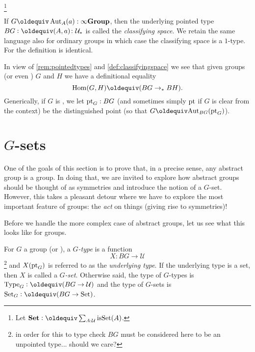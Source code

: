 \footnote{Let $\typeset\defequi \sum_{A:\mathcal U}\isset(A)$.}
\begin{definition}\label{def:classifyingspace}
  If $G\oldequiv\Aut_A(a):\typeinftygp$, then the underlying pointed type $BG\defequi (A,a)\colon\pttype$ is called the  \emph{classifying space}.  We retain the same language also for ordinary groups in which case the classifying space is a $1$-type.   For \inftygps the definition is identical.
\end{definition}
\begin{remark}
  In view of \cref{rem:pointedtypes} and \cref{def:classifyingspace} we see that given groups (or even \inftygps) $G$ and $H$ we have a definitional equality
$$\Hom(G,H)\oldequiv(BG\to_*BH).$$
Generically, if $G$ is \aninftygp, we let ${\mathord{\mathrm{pt}}}_G:BG$ (and sometimes simply ${\mathord{\mathrm{pt}}}$ if $G$ is clear from the context) be the distinguished point (so that $G\oldequiv\aut_{BG}(\pt_G)$).
\end{remark}





\section{$G$-sets}
\label{sec:gsets}

One of the goals of this section is to prove that, in a precise sense, any abstract group is a group.  In doing that, we are invited to explore how abstract groups should be thought of as symmetries and introduce the notion of a $G$-set.  However, this takes a pleasant detour where we have to explore the most important feature of groups: the \emph{act} on things (giving rise to symmetries)!

Before we handle the more complex case of abstract groups, let us see what this looks like for groups.

\begin{definition}
  For $G$ a group (or \inftygp), a \emph{$G$-type} is a function
  $$X\colon BG\to\mathcal U$$\footnote{in order for this to type check $BG$ must be considered here to be an unpointed type... should we care?}
and $X({\mathord{\mathrm{pt}}}_G)$ is referred to as the \emph{underlying type}.
If the underlying type is a set, then $X$ is called a \emph{$G$-set}.
Otherwise said, the type of $G$-types is $\Type_G\defequi(BG\to\mathcal U)$ and the type of $G$-sets is $\Set_G\defequi(BG\to\Set)$.
\end{definition}

